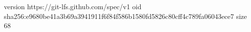 version https://git-lfs.github.com/spec/v1
oid sha256:e9680be41a3b69a3941911f6f84f586b1580fd5826c80cff4c789fa06043ece7
size 68
